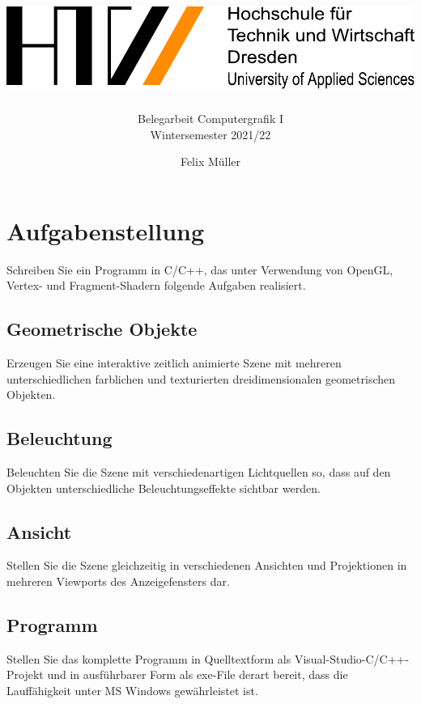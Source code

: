 \documentclass{scrartcl}
\begin{document}
\begin{titlepage}

	\pagestyle{empty}
	\title{\includegraphics[width=1\textwidth]{HTW.pdf}}
	\subtitle{Belegarbeit Computergrafik I \\Wintersemester 2021/22}
	\author{Felix Müller}
	\maketitle

\end{titlepage}

\tableofcontents
\listoffigures

\section{Aufgabenstellung}

Schreiben Sie ein Programm in C/C++, das unter Verwendung von OpenGL, Vertex- und
Fragment-Shadern folgende Aufgaben realisiert.

\subsection{Geometrische Objekte}
Erzeugen Sie eine interaktive zeitlich animierte Szene mit mehreren
unterschiedlichen farblichen und texturierten dreidimensionalen geometrischen Objekten.

\subsection{Beleuchtung}
Beleuchten Sie die Szene mit verschiedenartigen Lichtquellen so, dass auf den
Objekten unterschiedliche Beleuchtungseffekte sichtbar werden.

\subsection{Ansicht}
Stellen Sie die Szene gleichzeitig in verschiedenen Ansichten und Projektionen in
mehreren Viewports des Anzeigefensters dar.

\subsection{Programm}
Stellen Sie das komplette Programm in Quelltextform als Visual-Studio-C/C++-
Projekt und in ausführbarer Form als exe-File derart bereit, dass die Lauffähigkeit unter MS
Windows gewährleistet ist.
\end{document}

